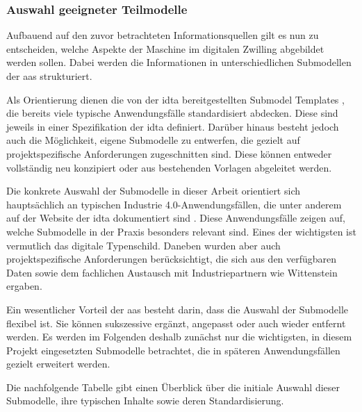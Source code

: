 \subsubsection{Auswahl geeigneter Teilmodelle}
Aufbauend auf den zuvor betrachteten Informationsquellen gilt es nun zu entscheiden, welche Aspekte der Maschine im digitalen Zwilling abgebildet werden sollen.
Dabei werden die Informationen in unterschiedlichen Submodellen der \acs{aas} strukturiert.

Als Orientierung dienen die von der \acs{idta} bereitgestellten Submodel Templates \cite{idtaTemplates}, die bereits viele typische Anwendungsfälle standardisiert abdecken.
Diese sind jeweils in einer Spezifikation der \acs{idta} definiert.
Darüber hinaus besteht jedoch auch die Möglichkeit, eigene Submodelle zu entwerfen, die gezielt auf projektspezifische Anforderungen zugeschnitten sind.
Diese können entweder vollständig neu konzipiert oder aus bestehenden Vorlagen abgeleitet werden.

Die konkrete Auswahl der Submodelle in dieser Arbeit orientiert sich hauptsächlich an typischen Industrie 4.0-Anwendungsfällen, die unter anderem auf der Website der \acs{idta} dokumentiert sind \cite{idtaUseCases}.
Diese Anwendungsfälle zeigen auf, welche Submodelle in der Praxis besonders relevant sind.
Eines der wichtigsten ist vermutlich das digitale Typenschild.
Daneben wurden aber auch projektspezifische Anforderungen berücksichtigt, die sich aus den verfügbaren Daten sowie dem fachlichen Austausch mit Industriepartnern wie Wittenstein ergaben.


Ein wesentlicher Vorteil der \acs{aas} besteht darin, dass die Auswahl der Submodelle flexibel ist.
Sie können sukszessive ergänzt, angepasst oder auch wieder entfernt werden.
Es werden im Folgenden deshalb zunächst nur die wichtigsten, in diesem Projekt eingesetzten Submodelle betrachtet, die in späteren Anwendungsfällen gezielt erweitert werden.

Die nachfolgende Tabelle gibt einen Überblick über die initiale Auswahl dieser Submodelle, ihre typischen Inhalte sowie deren Standardisierung.









